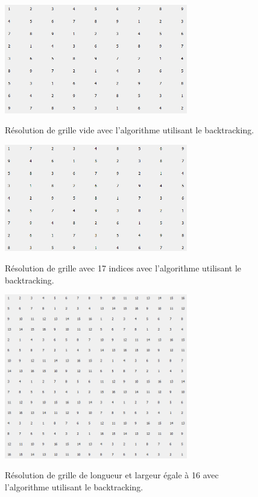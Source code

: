 \begin{figure}[h]
  \begin{center}
\includegraphics[width=8cm]{./images/Res_Back_Vide.png}\label{Test_Back}
\caption{Résolution de grille vide avec l'algorithme utilisant le backtracking.}
\end{center}
\end{figure}


\begin{figure}[h]
  \begin{center}
\includegraphics[width=8cm]{./images/Res_Back_17.png}\label{Test_Back_17}
\caption{Résolution de grille avec 17 indices avec l'algorithme utilisant le backtracking.}
\end{center}
\end{figure}


\begin{figure}[h]
  \begin{center}
\includegraphics[width=8cm]{./images/Resultat_16_Back.png}\label{Test_Back_16_16}
\caption{Résolution de grille de longueur et largeur égale à 16 avec l'algorithme utilisant le backtracking.}
\end{center}
\end{figure}

